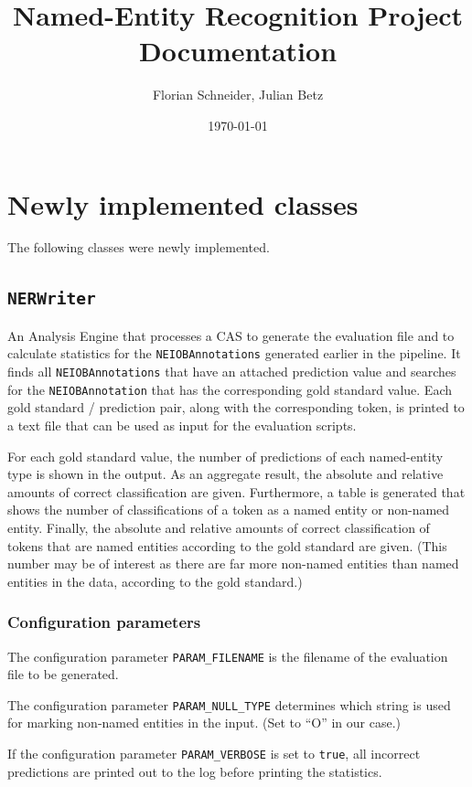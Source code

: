 \documentclass[11pt, english]{article}
\title{Named-Entity Recognition Project\\Documentation}
\author{Florian Schneider, Julian Betz}
\date{\today}
\begin{document}
\maketitle

\pagestyle{mainmatter}

\section{Newly implemented classes}
\label{sec:Classes}
The following classes were newly implemented.

\subsection{\texttt{NERWriter}}
An Analysis Engine that processes a CAS to generate the evaluation file and to calculate statistics for the \verb/NEIOBAnnotations/ generated earlier in the pipeline.
It finds all \verb/NEIOBAnnotations/ that have an attached prediction value and searches for the \verb/NEIOBAnnotation/ that has the corresponding gold standard value.
Each gold standard / prediction pair, along with the corresponding token, is printed to a text file that can be used as input for the evaluation scripts.

For each gold standard value, the number of predictions of each named-entity type is shown in the output.
As an aggregate result, the absolute and relative amounts of correct classification are given.
Furthermore, a table is generated that shows the number of classifications of a token as a named entity or non-named entity.
Finally, the absolute and relative amounts of correct classification of tokens that are named entities according to the gold standard are given.
(This number may be of interest as there are far more non-named entities than named entities in the data, according to the gold standard.)

\subsubsection{Configuration parameters}
The configuration parameter \verb/PARAM_FILENAME/ is the filename of the evaluation file to be generated.

The configuration parameter \verb/PARAM_NULL_TYPE/ determines which string is used for marking non-named entities in the input.
(Set to ``O'' in our case.)

If the configuration parameter \verb/PARAM_VERBOSE/ is set to \verb/true/, all incorrect predictions are printed out to the log before printing the statistics.
\end{document}
